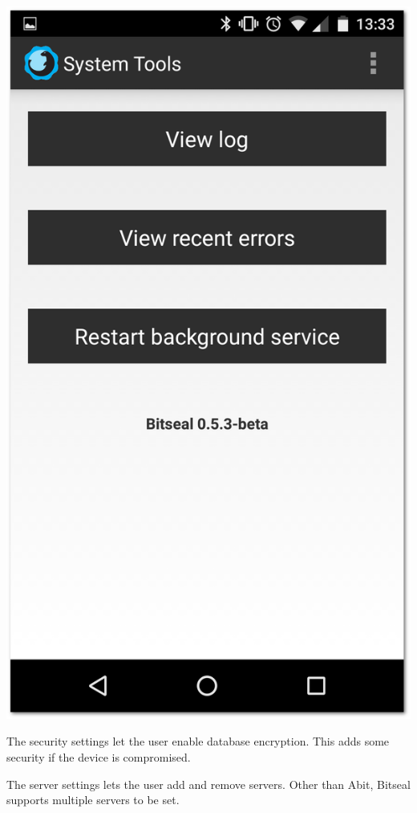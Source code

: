 \documentclass{bfh}
\begin{document}
\begin{center}
\begin{minipage}{.3\linewidth}
      \includegraphics[width=1.0 \textwidth]{images/screenshots/bitseal_settings_system_tools.png}
    \end{minipage}
  \end{center}

  The security settings let the user enable database encryption. This adds some security if the device is compromised.

  The server settings lets the user add and remove servers. Other than Abit, Bitseal supports multiple servers to be set.
\end{document}
